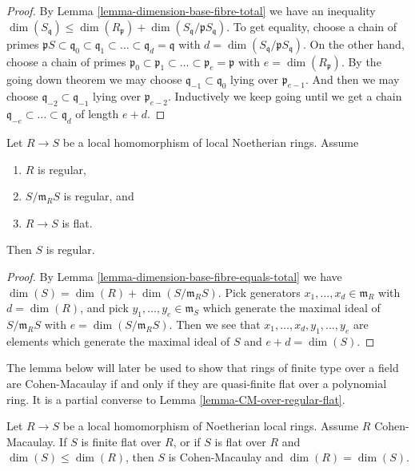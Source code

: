 \begin{proof}
By Lemma \ref{lemma-dimension-base-fibre-total}
we have an inequality
$\dim(S_{\mathfrak q}) \leq
\dim(R_{\mathfrak p}) + \dim(S_{\mathfrak q}/\mathfrak pS_{\mathfrak q})$.
To get equality, choose a chain of primes
$\mathfrak pS \subset \mathfrak q_0 \subset \mathfrak q_1 \subset \ldots
\subset \mathfrak q_d = \mathfrak q$ with
$d = \dim(S_{\mathfrak q}/\mathfrak pS_{\mathfrak q})$.
On the other hand, choose a chain of primes
$\mathfrak p_0 \subset \mathfrak p_1 \subset \ldots \subset \mathfrak p_e
= \mathfrak p$ with $e = \dim(R_{\mathfrak p})$.
By the going down theorem we may choose
$\mathfrak q_{-1} \subset \mathfrak q_0$ lying over
$\mathfrak p_{e-1}$. And then we may choose
$\mathfrak q_{-2} \subset \mathfrak q_{-1}$ lying over
$\mathfrak p_{e-2}$. Inductively we keep going until we
get a chain
$\mathfrak q_{-e} \subset \ldots \subset \mathfrak q_d$
of length $e + d$.
\end{proof}

\begin{lemma}
\label{lemma-flat-over-regular-with-regular-fibre}
Let $R \to S$ be a local homomorphism of local Noetherian rings.
Assume
\begin{enumerate}
\item $R$ is regular,
\item $S/\mathfrak m_RS$ is regular, and
\item $R \to S$ is flat.
\end{enumerate}
Then $S$ is regular.
\end{lemma}

\begin{proof}
By Lemma \ref{lemma-dimension-base-fibre-equals-total}
we have
$\dim(S) = \dim(R) + \dim(S/\mathfrak m_RS)$.
Pick generators $x_1, \ldots, x_d \in \mathfrak m_R$ with $d = \dim(R)$,
and pick $y_1, \ldots, y_e \in \mathfrak m_S$
which generate the maximal ideal of $S/\mathfrak m_RS$ with
$e = \dim(S/\mathfrak m_RS)$. Then we see that
$x_1, \ldots, x_d, y_1, \ldots, y_e$ are elements which generate
the maximal ideal of $S$ and $e + d = \dim(S)$.
\end{proof}

\noindent
The lemma below will later be used to show that rings of finite type over
a field are Cohen-Macaulay if and only if they are quasi-finite flat over
a polynomial ring. It is a partial converse to
Lemma \ref{lemma-CM-over-regular-flat}.

\begin{lemma}
\label{lemma-finite-flat-over-regular-CM}
Let $R \to S$ be a local homomorphism of Noetherian local rings.
Assume $R$ Cohen-Macaulay.
If $S$ is finite flat over $R$, or if $S$ is flat over $R$ and
$\dim(S) \leq \dim(R)$, then $S$ is Cohen-Macaulay and $\dim(R) = \dim(S)$.
\end{lemma}

